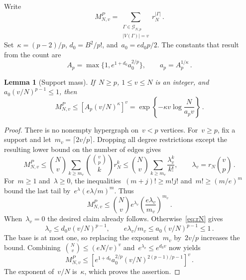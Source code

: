 \documentclass[10pt]{article}
\theoremstyle{plain}
\newtheorem{lemma}[theorem]{Lemma}
\theoremstyle{definition}
\theoremstyle{remark}
\begin{document}
Write
\begin{equation}\label{eq:tail-higher-mass-definition}
 M^P_{N,v}=\sum_{\substack{\Gamma\in\mathcal G_{N,p}\\|V(\Gamma)|=v}}r_N^{|\Gamma|}\,.
\end{equation}
Set~$\kappa=(p-2)/p$, $d_0=B^2/p!$, and~$a_0=ed_0p/2$. The constants that result from the count are
\begin{equation}\label{eq:tail-higher-constants}
 A_p=\max\{1,e^{1+d_0}a_0^{2/p}\},\qquad a_p=A_p^{1/\kappa}\,.
\end{equation}
\begin{lemma}[Support mass]\label{lem:tail-higher-mass}
If~$N\ge p$, $1\le v\le N$ is an integer, and~$a_0(v/N)^{p-1}\le1$, then
\begin{equation}\label{eq:tail-higher-mass}
 M^P_{N,v}\le\left[A_p(v/N)^\kappa\right]^v
 =\exp\!\left\{-\kappa v\log\frac{N}{a_pv}\right\}\,.
\end{equation}
\end{lemma}
\begin{proof}
There is no nonempty hypergraph on~$v<p$ vertices. For~$v\ge p$, fix a support and let~$m_v=\lceil2v/p\rceil$. Dropping all degree restrictions except the resulting lower bound on the number of edges gives
\begin{equation*}
 M^P_{N,v}\le\binom Nv\sum_{k\ge m_v}\binom{\binom vp}{k}r_N^k
 \le\binom Nv\sum_{k\ge m_v}\frac{\lambda_v^k}{k!},\qquad \lambda_v=r_N\binom vp\,.
\end{equation*}
For~$m\ge1$ and~$\lambda\ge0$, the inequalities~$(m+j)!\ge m!j!$ and~$m!\ge(m/e)^m$ bound the last tail by~$e^\lambda(e\lambda/m)^m$. Thus
\begin{equation}\label{eq:tail-poisson-bound}
 M^P_{N,v}\le\binom Nv e^{\lambda_v}\left(\frac{e\lambda_v}{m_v}\right)^{m_v}\,.
\end{equation}
When~$\lambda_v=0$ the desired claim already follows. Otherwise~\eqref{eq:rN} gives
\begin{equation*}
 \lambda_v\le d_0v(v/N)^{p-1},\qquad e\lambda_v/m_v\le a_0(v/N)^{p-1}\le1\,.
\end{equation*}
The base is at most one, so replacing the exponent~$m_v$ by~$2v/p$ increases the bound. Combining~$\binom Nv\le(eN/v)^v$ and~$e^{\lambda_v}\le e^{d_0v}$ now yields
\begin{equation*}
 M^P_{N,v}\le\left[e^{1+d_0}a_0^{2/p}(v/N)^{2(p-1)/p-1}\right]^v\,.
\end{equation*}
The exponent of~$v/N$ is~$\kappa$, which proves the assertion.
\end{proof}
\end{document}
